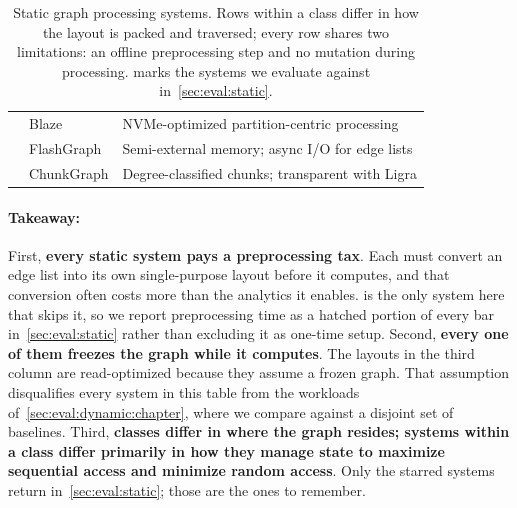 \begin{table}[t]
\begin{tabular}{@{}p{3.7cm}ll@{}}
      & Blaze\evalstar{}   & NVMe-optimized partition-centric processing \\
      & FlashGraph         & Semi-external memory; async I/O for edge lists \\
      & ChunkGraph         & Degree-classified chunks; transparent with Ligra \\
  \bottomrule
  \end{tabular}
  \caption{Static graph processing systems. Rows within a class differ in how the layout is packed and traversed; every row shares two limitations: an offline preprocessing step and no mutation during processing. \evalstar{} marks the systems we evaluate \project{} against in~\autoref{sec:eval:static}.}
  \label{tab:static_systems}
  \end{table}

\paragraph{Takeaway:}
First, \textbf{every static system pays a preprocessing tax}.
Each must convert an edge list into its own single-purpose layout before it computes, and that conversion often costs more than the analytics it enables.
\project{} is the only system here that skips it, so we report preprocessing time as a hatched portion of every bar in~\autoref{sec:eval:static} rather than excluding it as one-time setup.
Second, \textbf{every one of them freezes the graph while it computes}.
The layouts in the third column are read-optimized because they assume a frozen graph.
That assumption disqualifies every system in this table from the workloads of~\autoref{sec:eval:dynamic:chapter}, where we compare against a disjoint set of baselines.
Third, \textbf{classes differ in where the graph resides; systems within a class differ primarily in how they manage state to maximize sequential access and minimize random access}.
Only the starred systems return in~\autoref{sec:eval:static}; those are the ones to remember.

